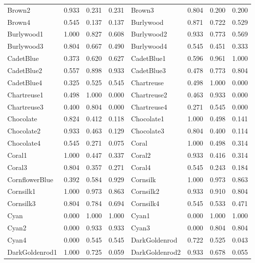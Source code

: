{\begin{center}
\begin{tabular}{|l|l|l|l|l|l|l|l|}
Brown2              & 0.933 & 0.231 & 0.231 & Brown3              & 0.804 & 0.200 & 0.200 \\ 
Brown4              & 0.545 & 0.137 & 0.137 & Burlywood           & 0.871 & 0.722 & 0.529 \\ 
Burlywood1          & 1.000 & 0.827 & 0.608 & Burlywood2          & 0.933 & 0.773 & 0.569 \\ 
Burlywood3          & 0.804 & 0.667 & 0.490 & Burlywood4          & 0.545 & 0.451 & 0.333 \\ 
CadetBlue           & 0.373 & 0.620 & 0.627 & CadetBlue1          & 0.596 & 0.961 & 1.000 \\ 
CadetBlue2          & 0.557 & 0.898 & 0.933 & CadetBlue3          & 0.478 & 0.773 & 0.804 \\ 
CadetBlue4          & 0.325 & 0.525 & 0.545 & Chartreuse          & 0.498 & 1.000 & 0.000 \\ 
Chartreuse1         & 0.498 & 1.000 & 0.000 & Chartreuse2         & 0.463 & 0.933 & 0.000 \\ 
Chartreuse3         & 0.400 & 0.804 & 0.000 & Chartreuse4         & 0.271 & 0.545 & 0.000 \\ 
Chocolate           & 0.824 & 0.412 & 0.118 & Chocolate1          & 1.000 & 0.498 & 0.141 \\ 
Chocolate2          & 0.933 & 0.463 & 0.129 & Chocolate3          & 0.804 & 0.400 & 0.114 \\ 
Chocolate4          & 0.545 & 0.271 & 0.075 & Coral               & 1.000 & 0.498 & 0.314 \\ 
Coral1              & 1.000 & 0.447 & 0.337 & Coral2              & 0.933 & 0.416 & 0.314 \\ 
Coral3              & 0.804 & 0.357 & 0.271 & Coral4              & 0.545 & 0.243 & 0.184 \\ 
CornflowerBlue      & 0.392 & 0.584 & 0.929 & Cornsilk            & 1.000 & 0.973 & 0.863 \\ 
Cornsilk1           & 1.000 & 0.973 & 0.863 & Cornsilk2           & 0.933 & 0.910 & 0.804 \\ 
Cornsilk3           & 0.804 & 0.784 & 0.694 & Cornsilk4           & 0.545 & 0.533 & 0.471 \\ 
Cyan                & 0.000 & 1.000 & 1.000 & Cyan1               & 0.000 & 1.000 & 1.000 \\ 
Cyan2               & 0.000 & 0.933 & 0.933 & Cyan3               & 0.000 & 0.804 & 0.804 \\ 
Cyan4               & 0.000 & 0.545 & 0.545 & DarkGoldenrod       & 0.722 & 0.525 & 0.043 \\ 
DarkGoldenrod1      & 1.000 & 0.725 & 0.059 & DarkGoldenrod2      & 0.933 & 0.678 & 0.055 \\ 
\hline
\end{tabular}
\end{center}

}
